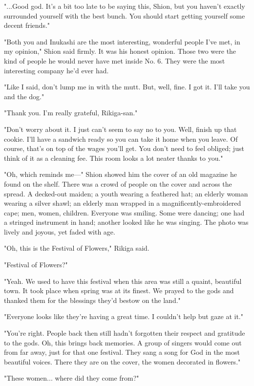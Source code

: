 "...Good god. It's a bit too late to be saying this, Shion, but you haven't exactly surrounded yourself with the best bunch. You should start getting yourself some decent friends."

"Both you and Inukashi are the most interesting, wonderful people I've met, in my opinion," Shion said firmly. It was his honest opinion. Those two were the kind of people he would never have met inside No. 6. They were the most interesting company he'd ever had.

"Like I said, don't lump me in with the mutt. But, well, fine. I got it. I'll take you and the dog."

"Thank you. I'm really grateful, Rikiga-san."

"Don't worry about it. I just can't seem to say no to you. Well, finish up that cookie. I'll have a sandwich ready so you can take it home when you leave. Of course, that's on top of the wages you'll get. You don't need to feel obliged; just think of it as a cleaning fee. This room looks a lot neater thanks to you."

"Oh, which reminds me---" Shion showed him the cover of an old magazine he found on the shelf. There was a crowd of people on the cover and across the spread. A decked-out maiden; a youth wearing a feathered hat; an elderly woman wearing a silver shawl; an elderly man wrapped in a magnificently-embroidered cape; men, women, children. Everyone was smiling. Some were dancing; one had a stringed instrument in hand; another looked like he was singing. The photo was lively and joyous, yet faded with age.

"Oh, this is the Festival of Flowers," Rikiga said.

"Festival of Flowers?"

"Yeah. We used to have this festival when this area was still a quaint, beautiful town. It took place when spring was at its finest. We prayed to the gods and thanked them for the blessings they'd bestow on the land."

"Everyone looks like they're having a great time. I couldn't help but gaze at it."

"You're right. People back then still hadn't forgotten their respect and gratitude to the gods. Oh, this brings back memories. A group of singers would come out from far away, just for that one festival. They sang a song for God in the most beautiful voices. There they are on the cover, the women decorated in flowers."

"These women... where did they come from?"

